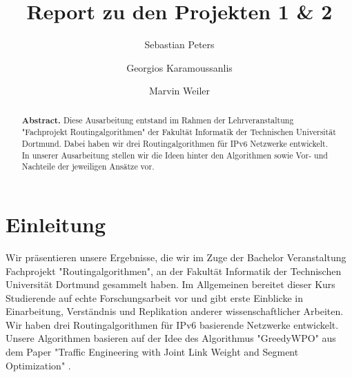 \documentclass[sigconf,noacm,review]{acmart}
\begin{document}
\title{Report zu den Projekten 1 \& 2}

\author{Sebastian Peters}
\author{Georgios Karamoussanlis}
\author{Marvin Weiler}
\renewcommand{\shortauthors}{Peters, Karamoussanlis, Weiler}

\begin{abstract}
\textbf{Abstract.}
  Diese Ausarbeitung entstand im Rahmen der Lehrveranstaltung "Fachprojekt Routingalgorithmen" der Fakultät Informatik der Technischen Universität Dortmund. 
  Dabei haben wir drei Routingalgorithmen für IPv6 Netzwerke entwickelt.
  In unserer Ausarbeitung stellen wir die Ideen hinter den Algorithmen sowie Vor- und Nachteile der jeweiligen Ansätze vor.
  
\end{abstract}



\maketitle

\section{Einleitung}
Wir präsentieren unsere Ergebnisse, die wir im Zuge der Bachelor Veranstaltung Fachprojekt "Routingalgorithmen", an der Fakultät Informatik der Technischen Universität Dortmund gesammelt haben.
Im Allgemeinen bereitet dieser Kurs Studierende auf echte Forschungsarbeit vor und gibt erste Einblicke in Einarbeitung, Verständnis und Replikation anderer wissenschaftlicher Arbeiten. 
Wir haben drei Routingalgorithmen für IPv6 basierende Netzwerke entwickelt.
Unsere Algorithmen basieren auf der Idee des Algorithmus "GreedyWPO" aus dem Paper "Traffic Engineering with Joint Link Weight and Segment Optimization" \cite{10.1145/3485983.3494846}.
\end{document}
